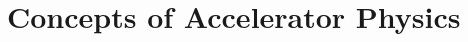 \chapter{Concepts of Accelerator Physics}
\thumbforchapter{}
\chaptertoc{}


\lipsum[1-9]
\lipsum[1-9]